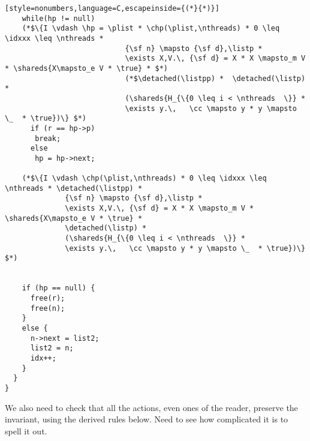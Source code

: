 \begin{figure*}
{\begin{lstlisting}[style=nonumbers,language=C,escapeinside={(*}{*)}]
    while(hp != null)
    (*$\{I \vdash \hp = \plist * \chp(\plist,\nthreads) * 0 \leq \idxxx \leq \nthreads *  
                            {\sf n} \mapsto {\sf d},\listp *
                            \exists X,V.\, {\sf d} = X * X \mapsto_m V * \shareds{X\mapsto_e V * \true} * $*)
                            (*$\detached(\listpp) *  \detached(\listp) * 
                            (\shareds{H_{\{0 \leq i < \nthreads  \}} * 
                            \exists y.\,   \cc \mapsto y * y \mapsto \_  * \true})\} $*)   
      if (r == hp->p)  
       break;
      else
       hp = hp->next; 
       
    (*$\{I \vdash \chp(\plist,\nthreads) * 0 \leq \idxxx \leq \nthreads * \detached(\listpp) *  
              {\sf n} \mapsto {\sf d},\listp *
              \exists X,V.\, {\sf d} = X * X \mapsto_m V * \shareds{X\mapsto_e V * \true} * 
              \detached(\listp) * 
              (\shareds{H_{\{0 \leq i < \nthreads  \}} * 
              \exists y.\,   \cc \mapsto y * y \mapsto \_  * \true})\} $*)   

      
    if (hp == null) {
      free(r);
      free(n);
    }  
    else {
      n->next = list2;
      list2 = n;
      idx++;
    }
  }
}
\end{lstlisting}
}
\end{figure*}

We also need to check that all the actions, even ones of the reader, preserve
the invariant, using the derived rules below. Need to see how complicated it is
to spell it out.


